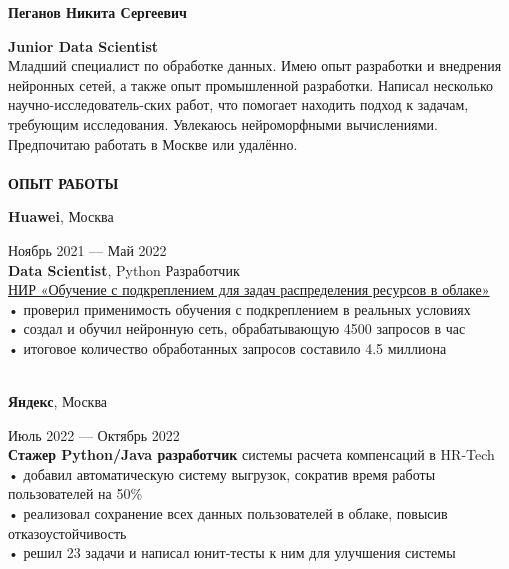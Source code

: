 \documentclass{article}
\begin{document}
\begin{vwcol}[widths={0.8,0.2},
 sep=.8cm, justify=flush,rule=0pt,indent=1em] 
\begin{spacing}{1.1}
\noindent\textbf{\Huge{Пеганов Никита Сергеевич}}\\
\end{spacing}
\noindent\textcolor[rgb]{0.1255,0.2902,0.7843}{\textbf{\Large{Junior Data Scientist}}}\\
Младший специалист по обработке данных. Имею опыт разработки и внедрения нейронных сетей, а также опыт промышленной разработки. Написал несколько научно-исследователь-ских работ, что помогает находить подход к задачам, требующим исследования. Увлекаюсь нейроморфными вычислениями. Предпочитаю работать в Москве или удалённо.\\
\\
\noindent\textcolor[rgb]{0.1255,0.2902,0.7843}{\textbf{\Large{ОПЫТ РАБОТЫ}}}\\
\begin{Large}
\textbf{Huawei}, Москва
\end{Large}
\hspace{198pt}Ноябрь 2021 — Май 2022\\
\textbf{Data Scientist}, Python Разработчик\\
\href{https://github.com/NikPeg/Reinforcement-learning-for-resource-allocation-tasks-in-the-cloud}{НИР «Обучение с подкреплением для задач распределения ресурсов в облаке»}\\
• проверил применимость обучения с подкреплением в реальных условиях\\
• создал и обучил нейронную сеть, обрабатывающую 4500 запросов в час\\
• итоговое количество обработанных запросов составило 4.5 миллиона\\
\\
\begin{Large}
\textbf{Яндекс}, Москва
\end{Large}
\hspace{185pt}Июль 2022 — Октябрь 2022\\
\textbf{Стажер Python/Java разработчик} системы расчета компенсаций в HR-Tech\\
• добавил автоматическую систему выгрузок, сократив время работы пользователей на 50\%\\
• реализовал сохранение всех данных пользователей в облаке, повысив отказоустойчивость\\
• решил 23 задачи и написал юнит-тесты к ним для улучшения системы\\

\end{vwcol}
\end{document}
